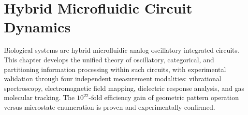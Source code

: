 \chapter{Hybrid Microfluidic Circuit Dynamics}
\label{ch:hybrid_circuits}


\begin{chapterabstract}
Biological systems are hybrid microfluidic analog oscillatory integrated circuits. This chapter develops the unified theory of oscillatory, categorical, and partitioning information processing within such circuits, with experimental validation through four independent measurement modalities: vibrational spectroscopy, electromagnetic field mapping, dielectric response analysis, and gas molecular tracking. The $10^{22}$-fold efficiency gain of geometric pattern operation versus microstate enumeration is proven and experimentally confirmed.
\end{chapterabstract}










